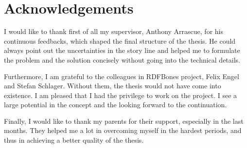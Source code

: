 \newpage
\chapter*{Acknowledgements}

I would like to thank first of all my supervisor, Anthony Arrascue, for his continuous feedbacks, which shaped the final structure of the thesis. He could always point out the uncertainties in the story line and helped me to formulate the problem and the solution concisely without going into the technical details.

Furthermore, I am grateful to the colleagues in RDFBones project, Felix Engel and Stefan Schlager. Without them, the thesis would not have come into existence. I am pleased that I had the privilege to work on the project. I see a large potential in the concept and the looking forward to the continuation.

Finally, I would like to thank my parents for their support, especially in the last months. They helped me a lot in overcoming myself in the hardest periods, and thus in achieving a better quality of the thesis.
